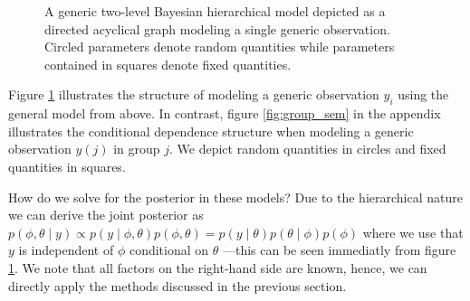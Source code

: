 \begin{figure}[!ht]
\begin{center}
\end{center}
\caption{A generic two-level Bayesian hierarchical model depicted as a directed acyclical graph modeling a single generic observation. Circled parameters denote random quantities while parameters contained in squares denote fixed quantities.}
\label{fig:general_sem}
\end{figure}

Figure \ref{fig:general_sem} illustrates the structure of modeling a generic observation $y_i$ using the general model from above.
In contrast, figure \ref{fig:group_sem} in the appendix illustrates the conditional dependence structure when modeling a generic observation $y(j)$ in group $j$.
We depict random quantities in circles and fixed quantities in squares.

How do we solve for the posterior in these models?
Due to the hierarchical nature we can derive the joint posterior as $p(\phi, \theta \mid y) \propto p(y \mid \phi, \theta) p(\phi, \theta) = p(y \mid \theta) p(\theta \mid \phi) p(\phi)$ where we use that $y$ is independent of $\phi$ conditional on $\theta$ ---this can be seen immediatly from figure \ref{fig:general_sem}.
We note that all factors on the right-hand side are known, hence, we can directly apply the methods discussed in the previous section.



